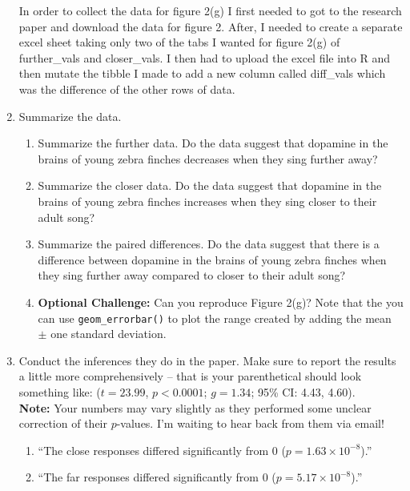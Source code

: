\documentclass{article}\usepackage[]{graphicx}\usepackage[]{xcolor}
\begin{document}
\begin{enumerate}
In order to collect the data for figure 2(g) I first needed to got to the research paper \citep{Kasdin25} and download the data for figure 2. After, I needed to create a separate excel sheet taking only two of the tabs I wanted for figure 2(g) of further\_vals and closer\_vals. I then had to upload the excel file into R and then mutate the tibble I made to add a new column called diff\_vals which was the difference of the other rows of data.
\item Summarize the data.
\begin{enumerate}
  \item Summarize the further data. Do the data suggest that
   dopamine in the brains of young zebra finches decreases when
   they sing further away?
   \item Summarize the closer data. Do the data suggest that
   dopamine in the brains of young zebra finches increases when
   they sing closer to their adult song?
  \item Summarize the paired differences. Do the data suggest
  that there is a difference between dopamine in the brains of
  young zebra finches when they sing further away compared to 
  closer to their adult song?
  \item \textbf{Optional Challenge:} Can you reproduce Figure 2(g)?
  Note that the you can use \texttt{geom\_errorbar()} to plot
  the range created by adding the mean $\pm$ one standard deviation.
\end{enumerate}
\item Conduct the inferences they do in the paper. Make sure to report the results
a little more comprehensively -- that is your parenthetical should look something
like: ($t=23.99$, $p<0.0001$; $g=1.34$; 95\% CI: 4.43, 4.60).\\
\textbf{Note:} Your numbers may vary slightly as they performed some unclear
correction of their $p$-values. I'm waiting to hear back from them via email!
\begin{enumerate}
  \item ``The close responses differed significantly from 0 ($p=1.63 \times 10^{-8}$).''
  \item ``The far responses differed significantly from 0 ($p=5.17 \times 10^{-8}$).''

\end{enumerate}
\end{enumerate}
\end{document}
